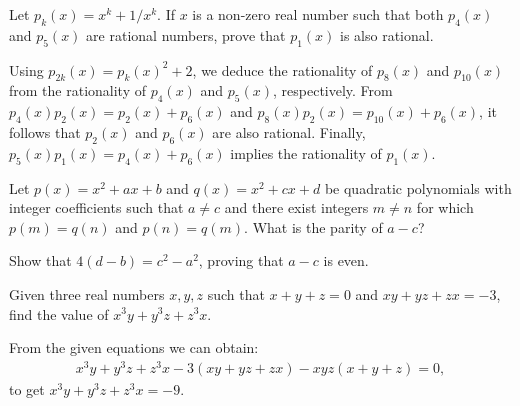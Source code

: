 \begin{tcolorbox}
\begin{question}
Let $p_k(x)=x^k+1/x^k$. If $x$ is a non-zero real number such that both $p_4(x)$ and $p_5(x)$ are rational numbers, prove that $p_1(x)$ is also rational.
\end{question}
\end{tcolorbox}

\begin{solution}
Using $p_{2k}(x)=p_k(x)^2+2$, we deduce the rationality of $p_8(x)$ and $p_{10}(x)$ from the rationality of 
 $p_4(x)$ and $p_5(x)$, respectively. From $p_4(x)p_2(x)=p_2(x)+p_6(x)$ and $p_8(x)p_2(x)=p_{10}(x)+p_6(x)$, it follows that $p_2(x)$ and $p_6(x)$ are also rational. Finally, $p_5(x)p_1(x)=p_4(x)+p_6(x)$ implies the rationality of $p_1(x)$.
\end{solution}



\begin{tcolorbox}
\begin{question}
Let $p(x)=x^2+ax+b$ and $q(x)=x^2+cx+d$ be quadratic polynomials with integer coefficients such that $a \neq c$ and there exist integers $m\neq n$ for which $p(m)=q(n)$ and $p(n)=q(m)$. What is the parity of $a-c$?
\end{question}
\end{tcolorbox}

\begin{solution}
Show that $4(d-b)=c^2-a^2$, proving that $a-c$ is even.
\end{solution}


\begin{tcolorbox}
\begin{question}
Given three real numbers $x,y,z$ such that $x+y+z=0$ and $xy+yz+zx=-3$, find the value of $x^3y+y^3z+z^3x$.
\end{question}
\end{tcolorbox}

\begin{solution}[name=Solution by CRMO 2012]
From the given equations we can obtain:
\begin{align*}
    x^3y+y^3z+z^3x-3(xy+yz+zx)-xyz(x+y+z)=0,
\end{align*}
to get $x^3y+y^3z+z^3x=-9$.
\end{solution}